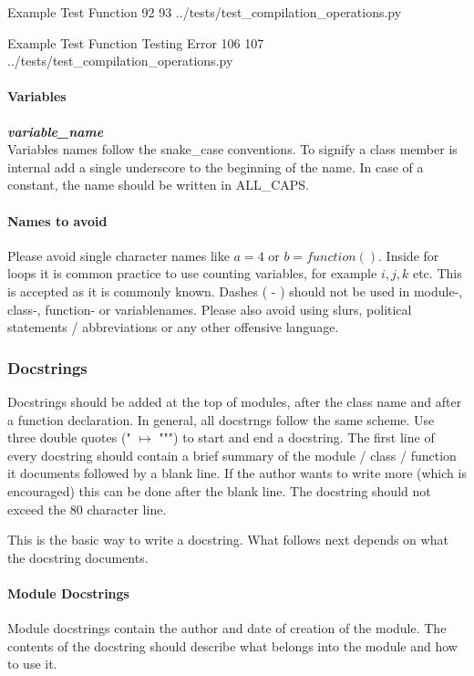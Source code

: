 \codeexample
{Example Test Function}
{92}
{93}
{../tests/test_compilation_operations.py}

\codeexample
{Example Test Function Testing Error}
{106}
{107}
{../tests/test_compilation_operations.py}

\paragraph{Variables} \textbf{\textit{variable\_name}} \\
Variables names follow the snake\_case conventions. To signify a class member
is internal add a single underscore to the beginning of the name. In case of
a constant, the name should be written in ALL\_CAPS.

\paragraph{Names to avoid} 
Please avoid single character names like $a = 4$ or $b = function()$. Inside
for loops it is common practice to use counting variables, for example $i, j,
k$ etc. This is accepted as it is commonly known. Dashes ( - ) should not be
used in module-, class-, function- or variablenames. Please also avoid using
slurs, political statements / abbreviations or any other offensive language.

\subsubsection{Docstrings}\label{ssub:docstrings}
Docstrings should be added at the top of modules, after the class name and
after a function declaration. In general, all docstrngs follow the same scheme.
Use three double quotes (" $\mapsto$ """) to start and end a docstring.  The
first line of every docstring should contain a brief summary of the module /
class / function it documents followed by a blank line. If the author wants to
write more (which is encouraged) this can be done after the blank line.  The
docstring should not exceed the 80 character line.

This is the basic way to write a docstring. What follows next depends on what
the docstring documents.

\paragraph{Module Docstrings} Module docstrings contain the author and date of
creation of the module. The contents of the docstring should describe what
belongs into the module and how to use it.


